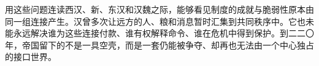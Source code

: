 用这些问题连读西汉、新、东汉和汉魏之际，能够看见制度的成就与脆弱性原本由同一组连接产生。汉曾多次让远方的人、粮和消息暂时汇集到共同秩序中。它也未能永远解决谁为这些连接付款、谁有权解释命令、谁在危机中得到保护。到二二〇年，帝国留下的不是一具空壳，而是一套仍能被争夺、却再也无法由一个中心独占的接口世界。







